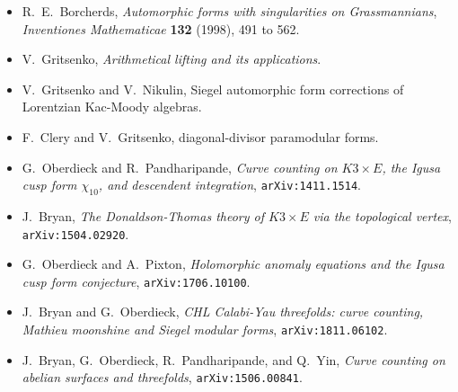 \begin{itemize}
\item R.~E.~Borcherds, \emph{Automorphic forms with singularities on
Grassmannians}, \emph{Inventiones Mathematicae} \textbf{132} (1998),
491 to 562.
\item V.~Gritsenko, \emph{Arithmetical lifting and its applications}.
\item V.~Gritsenko and V.~Nikulin, Siegel automorphic form corrections
of Lorentzian Kac-Moody algebras.
\item F.~Clery and V.~Gritsenko, diagonal-divisor paramodular forms.
\item G.~Oberdieck and R.~Pandharipande, \emph{Curve counting on
$K3\times E$, the Igusa cusp form $\chi_{10}$, and descendent
integration}, \texttt{arXiv:1411.1514}.
\item J.~Bryan, \emph{The Donaldson-Thomas theory of $K3\times E$ via
the topological vertex}, \texttt{arXiv:1504.02920}.
\item G.~Oberdieck and A.~Pixton, \emph{Holomorphic anomaly equations
and the Igusa cusp form conjecture}, \texttt{arXiv:1706.10100}.
\item J.~Bryan and G.~Oberdieck, \emph{CHL Calabi-Yau threefolds:
curve counting, Mathieu moonshine and Siegel modular forms},
\texttt{arXiv:1811.06102}.
\item J.~Bryan, G.~Oberdieck, R.~Pandharipande, and Q.~Yin,
\emph{Curve counting on abelian surfaces and threefolds},
\texttt{arXiv:1506.00841}.
\end{itemize}
